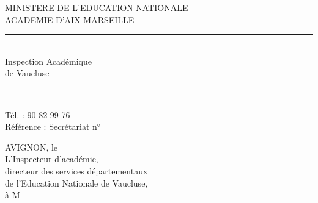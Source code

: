 

\noindent\begin{minipage}[t]{.48\linewidth}\raggedright\small
MINISTERE DE L'EDUCATION NATIONALE\\
ACADEMIE D'AIX-MARSEILLE\\
\hspace{2em}\rule{2cm}{0.3pt}\\
Inspection Académique\\
de Vaucluse\\
\hspace{2em}\rule{2cm}{0.3pt}\\
Tél. : 90 82 99 76\\
Référence : Secrétariat n°
\end{minipage}\hfill%
\begin{minipage}[t]{.48\linewidth}\raggedright\small
AVIGNON, le\\
L'Inspecteur d'académie,\\
directeur des services départementaux\\
de l'Education Nationale de Vaucluse,\\
à M
\end{minipage}






